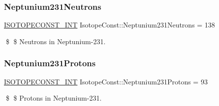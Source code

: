 \subsubsection{\texorpdfstring{Neptunium231\+Neutrons}{Neptunium231Neutrons}}
{\footnotesize\ttfamily \mbox{\hyperlink{group___isotope_const-_macros_ga5f18360b3e99483a35c32d789e62621c}{I\+S\+O\+T\+O\+P\+E\+C\+O\+N\+S\+T\+\_\+\+I\+NT}} Isotope\+Const\+::\+Neptunium231\+Neutrons = 138}

\$ \$ Neutrons in Neptunium-\/231. \mbox{\label{group___isotope_const-_neptunium-_np231_ga97a2c32e3cea578337666447be80faf2}} 
\subsubsection{\texorpdfstring{Neptunium231\+Protons}{Neptunium231Protons}}
{\footnotesize\ttfamily \mbox{\hyperlink{group___isotope_const-_macros_ga5f18360b3e99483a35c32d789e62621c}{I\+S\+O\+T\+O\+P\+E\+C\+O\+N\+S\+T\+\_\+\+I\+NT}} Isotope\+Const\+::\+Neptunium231\+Protons = 93}

\$ \$ Protons in Neptunium-\/231. 